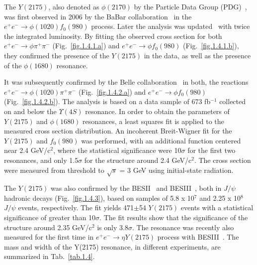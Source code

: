 The $Y(2175)$, also denoted as $\phi(2170)$ by the Particle Data Group (PDG)~\cite{Tanabashi18}, was first observed in 2006 by the BaBar collaboration~\cite{Aubert06} in the $e^{+}e^{-}\rightarrow \phi(1020)f_0(980)$ process. Later the analysis was updated~\cite{Aubert12} with twice the integrated luminosity. By fitting the observed cross section for both $e^{+}e^{-}\rightarrow \phi \pi^{+} \pi^{-}$ (Fig.~\ref{fig.1.4.1.a}) and $e^{+}e^{-}\rightarrow \phi f_0(980)$ (Fig.~\ref{fig.1.4.1.b}), they confirmed the presence of the $Y(2175)$ in the data, as well as the presence of the $\phi(1680)$ resonance.
~\par It was subsequently confirmed by the Belle collaboration~\cite{Shen09} in both, the reactions $e^{+}e^{-}\rightarrow \phi(1020)\pi^{+}\pi^{-}$ (Fig.~\ref{fig.1.4.2.a}) and $e^{+}e^{-}\rightarrow \phi f_0(980)$ (Fig.~\ref{fig.1.4.2.b}). The analysis is based on a data sample of 673 fb$^{-1}$ collected on and below the $\Upsilon(4S)$ resonance. In order to obtain the parameters of $Y(2175)$ and $\phi(1680)$ resonances, a least squares fit is applied to the measured cross section distribution. An incoherent Breit-Wigner fit for the $Y(2175)$ and $f_0(980)$ was performed, with an additional function centered near 2.4 GeV/c$^2$, where the statistical significance were 10$\sigma$ for the first two resonances, and only 1.5$\sigma$ for the structure around 2.4 GeV/c$^2$. The cross section were measured from threshold to $\sqrt{s}$ = 3 GeV using initial-state radiation.
~\par The $Y(2175)$ was also confirmed by the BESII~\cite{Ablikim08} and BESIII~\cite{Ablikim15}, both in $J/\psi$ hadronic decays (Fig.~\ref{fig.1.4.3}), based on samples of 5.8 x 10$^7$ and 2.25 x 10$^8$ $J/\psi$ events, respectively. The fit yields 471$\pm$54 $Y(2175)$ events with a statistical significance of greater than 10$\sigma$. The fit results show that the significance of the structure around 2.35 GeV/c$^2$ is only 3.8$\sigma$. The resonance was recently also measured for the first time in $e^{+}e^{-}\rightarrow \eta Y(2175)$ process with BESIII~\cite{Ablikim19}. The mass and width of the Y(2175) resonance, in different experiments, are summarized in Tab.~\ref{tab.1.4}.

